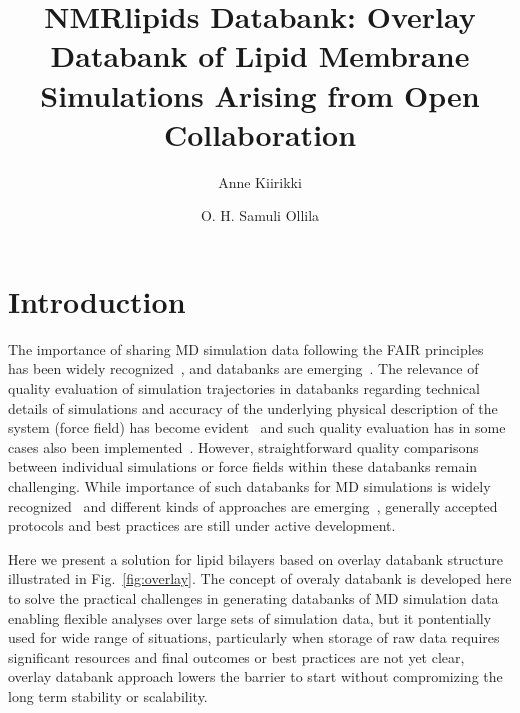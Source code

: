 \documentclass[fleqn,10pt]{wlscirep}
\title{NMRlipids Databank: Overlay Databank of Lipid Membrane Simulations Arising from Open Collaboration}
\author[1,*]{Anne Kiirikki}
\author[1,*]{O. H. Samuli Ollila}
\affil[1]{University of Helsinki, Institute of Biotechonology, Helsinki, Finland}
\affil[*]{samuli.ollila@helsinki.fi}
\begin{document}
\flushbottom
\maketitle
%
%
\thispagestyle{empty}


\section{Introduction}



The importance of sharing MD simulation data following the FAIR principles~\cite{wilkinson16} has been widely recognized~\cite{feig99,tai04,silva06,abraham19,hildebrand19,hospital20,abriata20,espigares20}, and databanks are emerging~\cite{meyer10,kamp10,hospital16,mixcoha16,newport19,bekker20,espigares20,leston22}.
The relevance of quality evaluation of simulation trajectories in databanks regarding technical details of simulations and accuracy of the underlying physical description of the system (force field) has become evident~\cite{tai04,meyer10,hospital20} and such quality evaluation has in some cases also been implemented~\cite{meyer10,hospital16}. However, straightforward quality comparisons between individual simulations or force fields within these databanks remain challenging. 
While importance of such databanks for MD simulations is widely recognized~\cite{feig99,tai04,silva06,abraham19,hildebrand19,hospital20,abriata20,espigares20} and different kinds of approaches are emerging~\cite{meyer10,kamp10,hospital16,mixcoha16,newport19,bekker20,espigares20,leston22}, generally accepted protocols and best practices are still under active development.


Here we present a solution for lipid bilayers based on overlay databank structure illustrated in Fig.~\ref{fig:overlay}.  The concept of overaly databank is developed here to solve the practical challenges in generating databanks of MD simulation data enabling flexible analyses over large sets of simulation data, but it pontentially used for wide range of situations, particularly when storage of raw data requires significant resources and final outcomes or best practices are not yet clear, overlay databank approach lowers the barrier to start without compromizing the long term stability or scalability.
\end{document}
